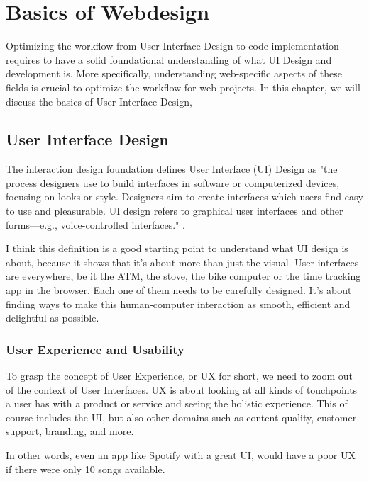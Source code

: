 \section{Basics of Webdesign}
Optimizing the workflow from User Interface Design to code implementation requires to have a solid foundational understanding of what UI Design and development is.
More specifically, understanding web-specific aspects of these fields is crucial to optimize the workflow for web projects.
In this chapter, we will discuss the basics of User Interface Design, 
    
    \subsection{User Interface Design}
    The interaction design foundation defines User Interface (UI) Design as 
    "the process designers use to build interfaces in software or computerized devices, 
    focusing on looks or style. Designers aim to create interfaces which users find easy to use and pleasurable. 
    UI design refers to graphical user interfaces and other forms—e.g., voice-controlled interfaces." .
    
    I think this definition is a good starting point to understand what UI design is about, because it shows that it's about more than just the visual.
    User interfaces are everywhere, be it the ATM, the stove, the bike computer or the time tracking app in the browser. 
    Each one of them needs to be carefully designed. It's about finding ways to make this human-computer interaction as smooth, efficient and delightful as possible.

    

        \subsubsection{User Experience and Usability}
        To grasp the concept of User Experience, or UX for short, we need to zoom out of the context of User Interfaces.
        UX is about looking at all kinds of touchpoints a user has with a product or service and seeing the holistic experience.
        This of course includes the UI, but also other domains such as content quality, customer support, branding, and more. 

        In other words, even an app like Spotify with a great UI, would have a poor UX if there were only 10 songs available.
        
